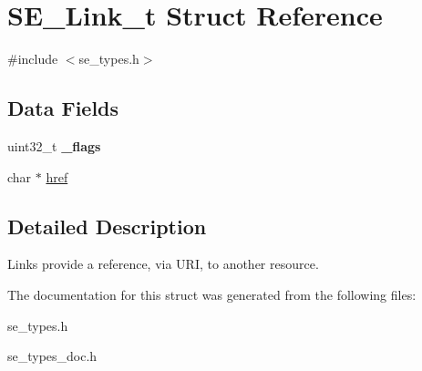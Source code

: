 \hypertarget{structSE__Link__t}{}\section{S\+E\+\_\+\+Link\+\_\+t Struct Reference}
\label{structSE__Link__t}


{\ttfamily \#include $<$se\+\_\+types.\+h$>$}

\subsection*{Data Fields}
\begin{DoxyCompactItemize}
\item 
uint32\+\_\+t {\bfseries \+\_\+flags}
\item 
char $\ast$ \hyperlink{group__Link_ga487ebc5f492311a2f580ad81500e6cdf}{href}
\end{DoxyCompactItemize}


\subsection{Detailed Description}
Links provide a reference, via U\+RI, to another resource. 

The documentation for this struct was generated from the following files\+:\begin{DoxyCompactItemize}
\item 
se\+\_\+types.\+h\item 
se\+\_\+types\+\_\+doc.\+h\end{DoxyCompactItemize}
